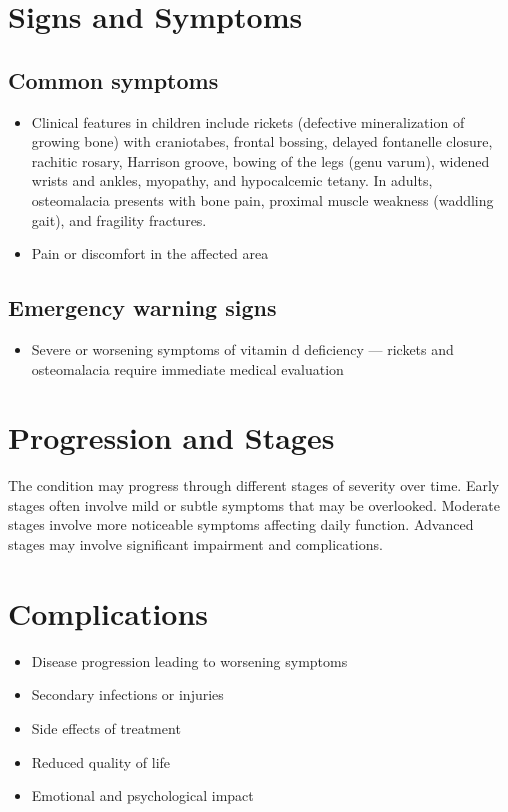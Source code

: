 \section{Signs and Symptoms}

\subsection{Common symptoms}
\begin{itemize}[noitemsep]
  \item Clinical features in children include rickets (defective mineralization of growing bone) with craniotabes, frontal bossing, delayed fontanelle closure, rachitic rosary, Harrison groove, bowing of the legs (genu varum), widened wrists and ankles, myopathy, and hypocalcemic tetany. In adults, osteomalacia presents with bone pain, proximal muscle weakness (waddling gait), and fragility fractures.
  \item Pain or discomfort in the affected area
  \end{itemize}

\subsection{Emergency warning signs}
\begin{itemize}[noitemsep]
  \item Severe or worsening symptoms of vitamin d deficiency --- rickets and osteomalacia require immediate medical evaluation
\end{itemize}
\section{Progression and Stages}
The condition may progress through different stages of severity over time. Early stages often involve mild or subtle symptoms that may be overlooked. Moderate stages involve more noticeable symptoms affecting daily function. Advanced stages may involve significant impairment and complications.
\section{Complications}
\begin{itemize}[noitemsep]
  \item Disease progression leading to worsening symptoms
  \item Secondary infections or injuries
  \item Side effects of treatment
  \item Reduced quality of life
  \item Emotional and psychological impact
\end{itemize}
